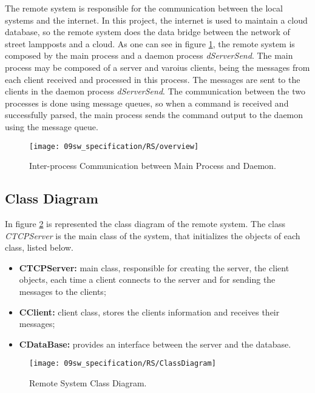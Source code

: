 The remote system is responsible for the communication between the local systems and the internet. In this project, the internet is used to maintain a cloud database, so the remote system does the data bridge between the network of street lampposts and a cloud. As one can see in figure \ref{fig:rs_overview}, the remote system is composed by the main process and a daemon process \textit{dServerSend}. The main process may be composed of a server and varoius clients, being the messages from each client received and processed in this process. The messages are sent to the clients in the daemon process \textit{dServerSend}. The communication between the two processes is done using message queues, so when a command is received and successfully parsed, the main process sends the command output to the daemon using the message queue.

\begin{figure}[H]
	\centering
	\texttt{[image: 09sw\_specification/RS/overview]}
	\caption{Inter-process Communication between Main Process and Daemon.}
	\label{fig:rs_overview}
\end{figure}

\subsection{Class Diagram}
In figure \ref{fig:rs_classDiag} is represented the class diagram of the remote system. The class \textit{CTCPServer} is the main class of the system, that initializes the objects of each class, listed below. 

\begin{itemize}
	\item \textbf{CTCPServer:} main class, responsible for creating the server, the client objects, each time a client connects to the server and for sending the messages to the clients;
	\item \textbf{CClient:} client class, stores the clients information and receives their messages;
	\item \textbf{CDataBase:} provides an interface between the server and the database.

\end{itemize}

\begin{figure}[H]
	\centering
	\texttt{[image: 09sw\_specification/RS/ClassDiagram]}
	\caption{Remote System Class Diagram.}
	\label{fig:rs_classDiag}
\end{figure}

